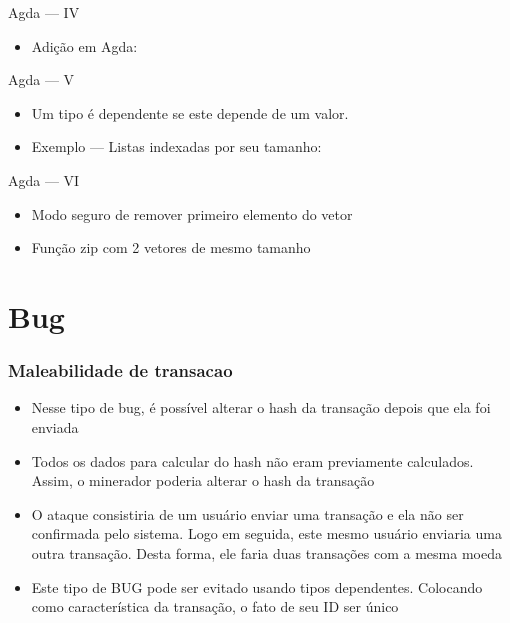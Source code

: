 \documentclass{beamer}
\begin{document}
\begin{frame}{Agda --- IV}
 \begin{itemize}
   \item Adição em Agda:
 \end{itemize}
\end{frame}

\begin{frame}{Agda --- V}
 \begin{itemize}
   \item Um tipo é dependente se este depende de um valor.
   \item Exemplo --- Listas indexadas por seu tamanho:
 \end{itemize}
\end{frame}

\begin{frame}{Agda --- VI}
 \begin{itemize}
   \item Modo seguro de remover primeiro elemento do vetor
   \item Função zip com 2 vetores de mesmo tamanho
 \end{itemize}
\end{frame}

\section{Bug}

 \begin{frame}
   \frametitle{Maleabilidade de transacao}
\begin{itemize}
  \item Nesse tipo de bug, é possível alterar o hash da transação depois que ela foi enviada
  \item Todos os dados para calcular do hash não eram previamente calculados. Assim, o minerador poderia alterar o hash da transação
  \item O ataque consistiria de um usuário enviar uma transação e ela não ser confirmada pelo sistema.
    Logo em seguida, este mesmo usuário enviaria uma outra transação. Desta forma, ele faria duas transações com a mesma moeda
  \item Este tipo de BUG pode ser evitado usando tipos dependentes. Colocando como característica da transação, o fato de seu ID ser único
\end{itemize}
\end{frame}
\end{document}
